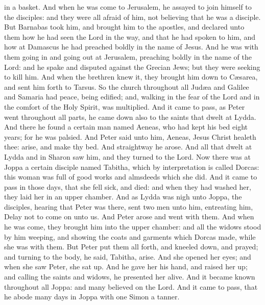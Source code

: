 in a basket.  And when he was come to Jerusalem, he assayed to join himself to the disciples: and they were all afraid of him, not believing that he was a disciple. But Barnabas took him, and brought him to the apostles, and declared unto them how he had seen the Lord in the way, and that he had spoken to him, and how at Damascus he had preached boldly in the name of Jesus. And he was with them going in and going out at Jerusalem, preaching boldly in the name of the Lord: and he spake and disputed against the Grecian Jews; but they were seeking to kill him. And when the brethren knew it, they brought him down to Cæsarea, and sent him forth to Tarsus.  So the church throughout all Judæa and Galilee and Samaria had peace, being edified; and, walking in the fear of the Lord and in the comfort of the Holy Spirit, was multiplied.  And it came to pass, as Peter went throughout all parts, he came down also to the saints that dwelt at Lydda. And there he found a certain man named Aeneas, who had kept his bed eight years; for he was palsied. And Peter said unto him, Aeneas, Jesus Christ healeth thee: arise, and make thy bed. And straightway he arose. And all that dwelt at Lydda and in Sharon saw him, and they turned to the Lord.  Now there was at Joppa a certain disciple named Tabitha, which by interpretation is called Dorcas: this woman was full of good works and almsdeeds which she did. And it came to pass in those days, that she fell sick, and died: and when they had washed her, they laid her in an upper chamber. And as Lydda was nigh unto Joppa, the disciples, hearing that Peter was there, sent two men unto him, entreating him, Delay not to come on unto us. And Peter arose and went with them. And when he was come, they brought him into the upper chamber: and all the widows stood by him weeping, and showing the coats and garments which Dorcas made, while she was with them. But Peter put them all forth, and kneeled down, and prayed; and turning to the body, he said, Tabitha, arise. And she opened her eyes; and when she saw Peter, she sat up. And he gave her his hand, and raised her up; and calling the saints and widows, he presented her alive. And it became known throughout all Joppa: and many believed on the Lord. And it came to pass, that he abode many days in Joppa with one Simon a tanner. 

